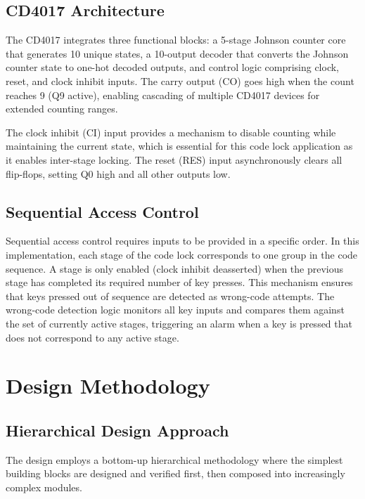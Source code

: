 \documentclass[12pt,a4paper]{report}
\begin{document}
\section{CD4017 Architecture}

The CD4017 integrates three functional blocks: a 5-stage Johnson counter core that generates 10 unique states, a 10-output decoder that converts the Johnson counter state to one-hot decoded outputs, and control logic comprising clock, reset, and clock inhibit inputs. The carry output (CO) goes high when the count reaches 9 (Q9 active), enabling cascading of multiple CD4017 devices for extended counting ranges.

The clock inhibit (CI) input provides a mechanism to disable counting while maintaining the current state, which is essential for this code lock application as it enables inter-stage locking. The reset (RES) input asynchronously clears all flip-flops, setting Q0 high and all other outputs low.

\section{Sequential Access Control}

Sequential access control requires inputs to be provided in a specific order. In this implementation, each stage of the code lock corresponds to one group in the code sequence. A stage is only enabled (clock inhibit deasserted) when the previous stage has completed its required number of key presses. This mechanism ensures that keys pressed out of sequence are detected as wrong-code attempts. The wrong-code detection logic monitors all key inputs and compares them against the set of currently active stages, triggering an alarm when a key is pressed that does not correspond to any active stage.

\chapter{Design Methodology}

\section{Hierarchical Design Approach}

The design employs a bottom-up hierarchical methodology where the simplest building blocks are designed and verified first, then composed into increasingly complex modules.
\end{document}
